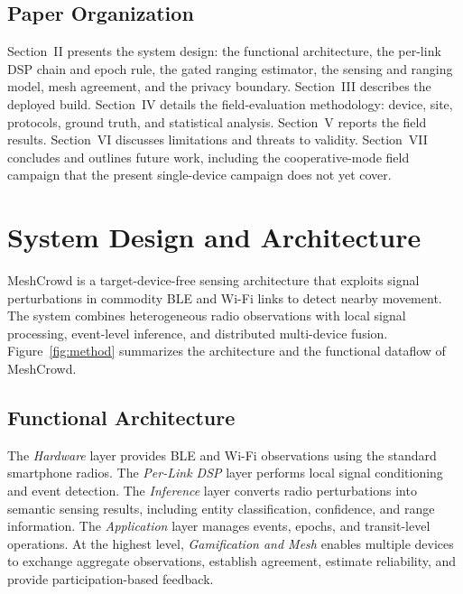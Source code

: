 \documentclass[journal,10pt]{IEEEtran}
\begin{document}
\subsection{Paper Organization}
Section~II presents the system design: the functional architecture, the
per-link DSP chain and epoch rule, the gated ranging estimator, the sensing
and ranging model, mesh agreement, and the privacy boundary. Section~III
describes the deployed build. Section~IV details the field-evaluation
methodology: device, site, protocols, ground truth, and statistical
analysis. Section~V reports the field results. Section~VI discusses
limitations and threats to validity. Section~VII concludes and outlines
future work, including the cooperative-mode field campaign that the present
single-device campaign does not yet cover.

\section{System Design and Architecture}
MeshCrowd is a target-device-free sensing architecture that exploits signal
perturbations in commodity BLE and Wi-Fi links to detect nearby movement.
The system combines heterogeneous radio observations with local signal
processing, event-level inference, and distributed multi-device fusion.
Figure~\ref{fig:method} summarizes the architecture and the functional
dataflow of MeshCrowd.

\subsection{Functional Architecture}
The \emph{Hardware} layer provides BLE and Wi-Fi observations using the
standard smartphone radios. The \emph{Per-Link DSP} layer performs local
signal conditioning and event detection. The \emph{Inference} layer converts
radio perturbations into semantic sensing results, including entity
classification, confidence, and range information. The \emph{Application}
layer manages events, epochs, and transit-level operations. At the highest
level, \emph{Gamification and Mesh} enables multiple devices to exchange
aggregate observations, establish agreement, estimate reliability, and
provide participation-based feedback.
\end{document}
